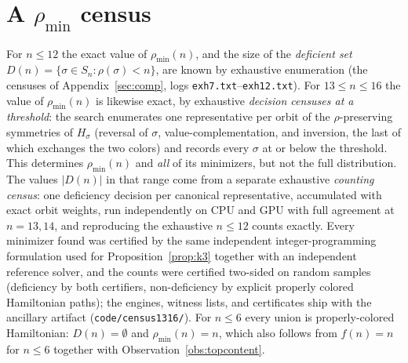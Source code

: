 \documentclass[11pt]{article}
\theoremstyle{definition}
\newcommand{\pmin}{\rho_{\min}}
\begin{document}

\section{A \texorpdfstring{$\pmin$}{rho-min} census}\label{app:census}

For $n \le 12$ the exact value of $\pmin(n)$, and the size of the \emph{deficient
set} $D(n) = \{\sigma \in S_n : \rho(\sigma) < n\}$, are known by exhaustive
enumeration (the censuses of Appendix~\ref{sec:comp}, logs
\texttt{exh7.txt}--\texttt{exh12.txt}).
For $13 \le n \le 16$ the value of
$\pmin(n)$ is likewise exact, by exhaustive \emph{decision censuses at a
threshold}: the search enumerates one representative per orbit of the
$\rho$-preserving symmetries of $H_\sigma$ (reversal of $\sigma$,
value-complementation, and inversion, the last of which exchanges the two
colors) and records every $\sigma$ at or below the threshold. This determines
$\pmin(n)$ and \emph{all} of its minimizers, but not the full distribution.
The values $|D(n)|$ in that range come from a separate exhaustive
\emph{counting census}: one deficiency decision per canonical representative,
accumulated with exact orbit weights, run independently on CPU and GPU with
full agreement at $n = 13, 14$, and reproducing the exhaustive $n \le 12$
counts exactly. Every minimizer found was certified by the same independent
integer-programming formulation used for Proposition~\ref{prop:k3} together
with an independent reference solver, and the counts were certified two-sided
on random samples (deficiency by both certifiers, non-deficiency by explicit
properly colored Hamiltonian paths); the engines, witness lists, and
certificates ship with the ancillary artifact
(\texttt{code/census1316/}). For
$n \le 6$ every union is
properly-colored Hamiltonian: $D(n) = \emptyset$ and $\pmin(n) = n$, which also
follows from $f(n) = n$ for $n \le 6$ together with
Observation~\ref{obs:topcontent}.
\end{document}
